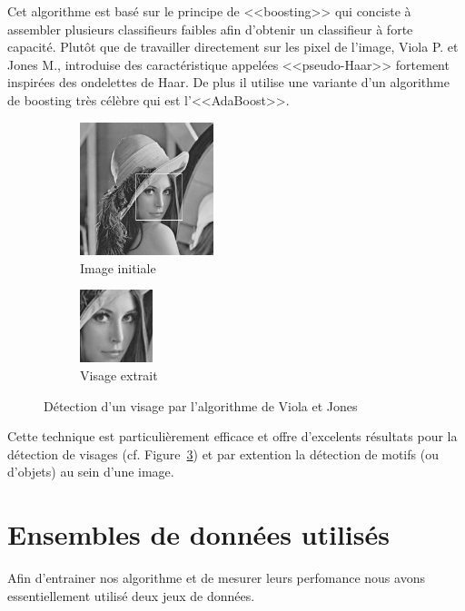 \documentclass[a4paper,10pt,twocolumn]{extarticle}
\begin{document}
Cet algorithme est basé sur le principe de <<boosting>> qui conciste à assembler plusieurs classifieurs faibles afin d'obtenir un classifieur à forte capacité. Plutôt que de travailler directement sur les pixel de l'image, Viola P. et Jones M., introduise des caractéristique appelées <<pseudo-Haar>> fortement inspirées des ondelettes de Haar. De plus il utilise une variante d'un algorithme de boosting très célèbre qui est l'<<AdaBoost>>.
\begin{figure}[H]
        \centering
        \begin{subfigure}[b]{110pt}
                \centering
                \includegraphics[width=110pt]{images_rapport/lena.png}
                \caption{Image initiale}
                \label{fig:lena}
        \end{subfigure}
        \begin{subfigure}[b]{110pt}
                \centering
                \includegraphics[width=60pt]{images_rapport/lena_face.png}
                \caption{Visage extrait}
                \label{fig:lena_face}
        \end{subfigure}
        \caption{Détection d'un visage par l'algorithme de Viola et Jones \cite{viola01} \label{fig:viola_detect}}
\end{figure}
Cette technique est particulièrement efficace et offre d'excelents résultats pour la détection de visages (cf. Figure~\ref{fig:viola_detect}) et par extention la détection de motifs (ou d'objets) au sein d'une image.

\section{Ensembles de données utilisés}
Afin d'entrainer nos algorithme et de mesurer leurs perfomance nous avons essentiellement utilisé deux jeux de données.
\end{document}
